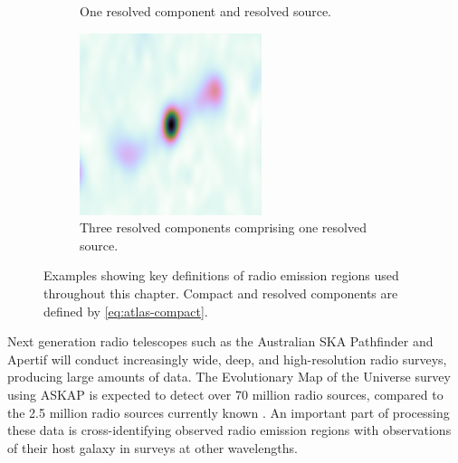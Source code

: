 \begin{figure}
\begin{subfigure}{0.3\textwidth}
            \caption{One resolved component and resolved source.}
        \end{subfigure}
        \begin{subfigure}{0.3\textwidth}
            \includegraphics[width=\textwidth]{atlas-images/cdfs_185_resolved.png}
            \caption{Three resolved components comprising one resolved source.}
        \end{subfigure}
        \caption[Examples showing key definitions of radio emission regions used throughout this chapter.]{\label{fig:definitions} Examples showing key definitions of radio emission regions used throughout this chapter.
                 Compact and resolved components are defined by \autoref{eq:atlas-compact}.}
    \end{figure}

    Next generation radio telescopes such as the Australian SKA Pathfinder \citep[ASKAP;][]{johnston07} and Apertif \citep{verheijen08} will conduct increasingly wide, deep, and high-resolution radio surveys, producing large amounts of data. The Evolutionary Map of the Universe \citep[EMU;][]{norris11} survey using ASKAP is expected to detect over 70 million radio sources, compared to the 2.5 million radio sources currently known \citep{banfield15}. An important part of processing these data is cross-identifying observed radio emission regions with observations of their host galaxy in surveys at other wavelengths.

